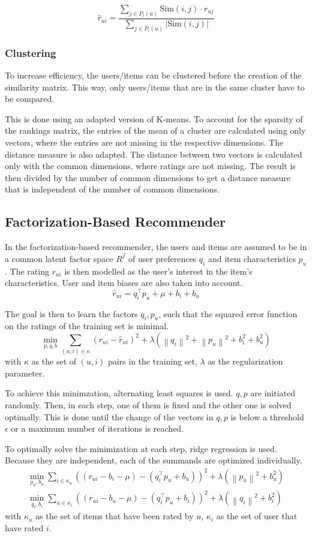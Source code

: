 \documentclass[12pt]{scrartcl}
\newcommand{\abs}[1]{\left\vert #1 \right\vert}
\newcommand{\norm}[1]{\left\| #1 \right\|}
\def\T{\top}
\begin{document}
$$\hat{r}_{ui} = \frac{\sum\limits_{j \in P_i(u)} \text{Sim}(i, j) \cdot r_{uj}}{\sum\limits_{j \in P_i(u)} \abs{\text{Sim}(i, j)}}$$

\subsubsection{Clustering}
To increase efficiency, the users/items can be clustered before the creation of the similarity matrix. This way, only users/items that are in the same cluster have to be compared.

This is done using an adapted version of K-means.
To account for the sparsity of the rankings matrix, the entries of the mean of a cluster are calculated using only vectors, where the entries are not missing in the respective dimensions.
The distance measure is also adapted. The distance between two vectors is calculated only with the common dimensions, where ratings are not missing.
The result is then divided by the number of common dimensions to get a distance measure that is independent of the number of common dimensions.


\subsection[Factorization]{Factorization-Based Recommender}
In the factorization-based recommender, the users and items are assumed to be in a common latent factor space $R^f$ of user preferences $q_i$ and item characteristics $p_u$.
The rating $r_{ui}$ is then modelled as the user's interest in the item's characteristics. User and item biases are also taken into account.
$$\hat{r}_{ui} = q_i^\T p_u + \mu + b_i + b_u$$

The goal is then to learn the factors $q_i, p_u$, such that the squared error function on the ratings of the training set is minimal.
$$\min\limits_{p, q, b} \sum\limits_{(u, i) \in \kappa} (r_{ui} - \hat{r}_{ui})^2 + \lambda \left(\norm{q_i}^2 + \norm{p_u}^2 + b_i^2 + b_u^2\right)$$
with $\kappa$ as the set of $(u, i)$ pairs in the training set, $\lambda$ as the regularization parameter.

To achieve this minimzation, alternating least squares is used.
$q, p$ are initiated randomly.
Then, in each step, one of them is fixed and the other one is solved optimally.
This is done until the change of the vectors in $q, p$ is below a threshold $\epsilon$ or a maximum number of iterations is reached.

To optimally solve the minimization at each step, ridge regression is used.
Because they are independent, each of the summands are optimized individually.
\begin{gather*}
	\min\limits_{p_u, b_u} \sum\limits_{i \in \kappa_u} \left((r_{ui} - b_i - \mu) - (q_i^\T p_u + b_u)\right)^2 + \lambda \left(\norm{p_u}^2 + b_u^2\right)\\
	\min\limits_{q_i, b_i} \sum\limits_{u \in \kappa_i} \left((r_{ui} - b_u - \mu) - (q_i^\T p_u + b_i)\right)^2 + \lambda \left(\norm{q_i}^2 + b_i^2\right)
\end{gather*}
with $\kappa_u$ as the set of items that have been rated by $u$, $\kappa_i$ as the set of user that have rated $i$.
\end{document}
